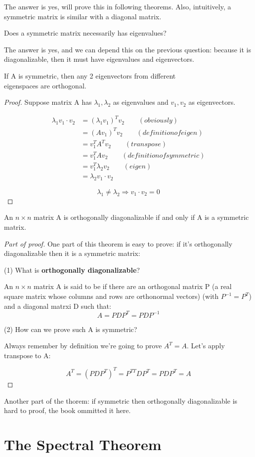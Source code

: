 The answer is yes, will prove this in following theorems. Also, intuitively, a symmetric matrix is similar with a diagonal matrix.

\begin{remark}
    Does a symmetric matrix necessarily has eigenvalues?
\end{remark}

The answer is yes, and we can depend this on the previous question: because it is diagonalizable, then it must have eigenvalues and eigenvectors.

\begin{theorem}
    If A is symmetric, then any 2 eigenvectors from different \\ eigenspaces are orthogonal.
\end{theorem}

\begin{proof}
    Suppose matrix A has $\lambda_1, \lambda_2$ as eigenvalues and $v_1, v_2$ as eigenvectors.

    \begin{align*}
        \lambda_1v_1 \cdot v_2 & = (\lambda_1 v_1)^{T} v_2 \qquad(obviously)\\
        & = (Av_1)^T v_2 \qquad(definition of eigen)  \\
        & = v_1^T A^T v_2 \qquad(transpose) \\
        & = v_1^T A v_2 \qquad(definition of symmetric) \\
        & = v_1^T \lambda_2 v_2 \qquad(eigen) \\
        & = \lambda_2 v_1 \cdot v_2
    \end{align*}

    $$\lambda_1 \neq \lambda_2 \Rightarrow v_1 \cdot v_2 = 0$$
\end{proof}

\begin{theorem}
    An $n \times n$ matrix A is orthogonally diagonalizable if and only if A is a symmetric matrix.
\end{theorem}

\begin{proof}[Part of proof]
One part of this theorem is easy to prove: if it's orthogonally diagonalizable then it is a symmetric matrix:

(1) What is \textbf{orthogonally diagonalizable}?

An $n \times n$ matrix A is said to be  if there are an orthogonal matrix P (a real square matrix whose columns and rows are orthonormal vectors) (with $P^{-1} = P^T$) and a diagonal matrxi D such that:
$$A = PDP^T = PDP^{-1}$$

(2) How can we prove such A is symmetric?

Always remember by definition we're going to prove $A^T = A$. Let's apply transpose to A:

$$A^T = (PDP^T)^T = P^{TT}DP^T = PDP^T = A$$
\end{proof}

Another part of the thorem: if symmetric then orthogonally diagonalizable is hard to proof, the book ommitted it here.


\section{The Spectral Theorem}
